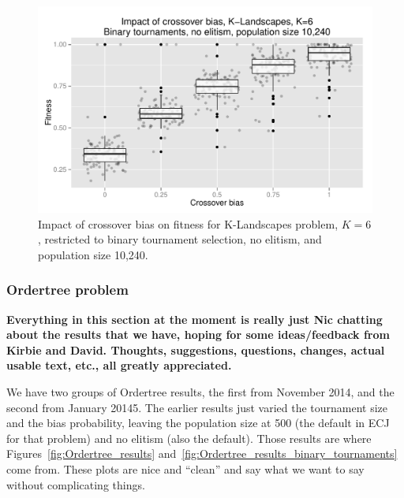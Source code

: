 \documentclass{sig-alternate}
\begin{document}
\begin{figure}
\centering
\includegraphics[width=0.45 \textwidth]{Plots/KLandscapes6_XO_bias_strong_impact_alpha_075.pdf}
\caption{Impact of crossover bias on fitness for K-Landscapes problem, $K=6$, restricted to binary tournament 
selection, no elitism, and population size 10,240.}
\label{fig:KLandscapes6_strong_results}
\end{figure}

%
%
%
%

%
%
%
%

\subsubsection{Ordertree problem}

\textbf{Everything in this section at the moment is really just Nic chatting about the results that we have, hoping for 
some ideas/feedback from Kirbie and David. Thoughts, suggestions, questions, changes, actual usable text, etc., all 
greatly appreciated.}

We have two groups of Ordertree results, the first from November 2014, and the second from January 20145. The 
earlier results just varied the tournament size and the bias probability, leaving the population size at 500 (the default in 
ECJ for that problem) and no elitism (also the default). Those results are where Figures~\ref{fig:Ordertree_results} 
and~\ref{fig:Ordertree_results_binary_tournaments} come from. These plots are nice and ``clean'' and say what we 
want to say without complicating things.
\end{document}
